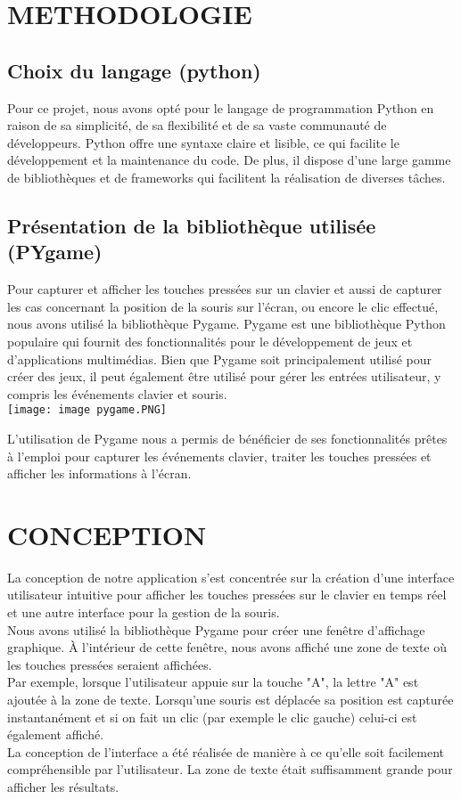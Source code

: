 \documentclass[12pt,a4paper]{article}
\begin{document}
\section{METHODOLOGIE}
\subsection{Choix du langage (python)}
Pour ce projet, nous avons opté pour le langage de programmation Python en raison de sa simplicité, de sa flexibilité et de sa vaste communauté de développeurs. Python offre une syntaxe claire et lisible, ce qui facilite le développement et la maintenance du code. De plus, il dispose d'une large gamme de bibliothèques et de frameworks qui facilitent la réalisation de diverses tâches.
\\
\subsection{Présentation de la bibliothèque utilisée (PYgame)}
Pour capturer et afficher les touches pressées sur un clavier et aussi de capturer les cas concernant la position de la souris sur l’écran, ou encore le clic effectué, nous avons utilisé la bibliothèque Pygame. Pygame est une bibliothèque Python populaire qui fournit des fonctionnalités pour le développement de jeux et d'applications multimédias. Bien que Pygame soit principalement utilisé pour créer des jeux, il peut également être utilisé pour gérer les entrées utilisateur, y compris les événements clavier et souris.\\
\texttt{[image: image pygame.PNG]} 
\begin{flushleft}
L'utilisation de Pygame nous a permis de bénéficier de ses fonctionnalités prêtes à l'emploi pour capturer les événements clavier, traiter les touches pressées et afficher les informations à l'écran.
\end{flushleft}

\newpage
\section{CONCEPTION}
La conception de notre application s'est concentrée sur la création d'une interface utilisateur intuitive pour afficher les touches pressées sur le clavier en temps réel et une autre interface pour la gestion de la souris.
\\
Nous avons utilisé la bibliothèque Pygame pour créer une fenêtre d'affichage graphique. À l'intérieur de cette fenêtre, nous avons affiché une zone de texte où les touches pressées seraient affichées.
\\
Par exemple, lorsque l'utilisateur appuie sur la touche "A", la lettre "A" est ajoutée à la zone de texte. Lorsqu'une souris est déplacée sa position est capturée instantanément et si on fait un clic (par exemple le clic gauche) celui-ci est également affiché.
\\
La conception de l'interface a été réalisée de manière à ce qu'elle soit facilement compréhensible par l'utilisateur. La zone de texte était suffisamment grande pour afficher les résultats.
\end{document}
